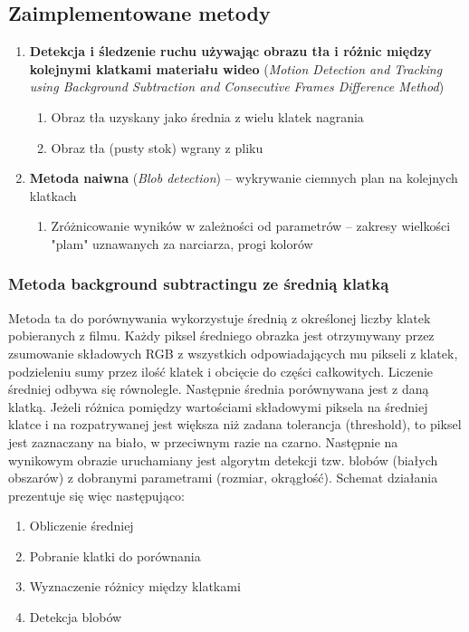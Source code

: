 \documentclass[a4paper]{article}
\begin{document}
\subsection{Zaimplementowane metody}
\label{sec:Methods}
\begin{enumerate}
\item \textbf{Detekcja i śledzenie ruchu używając obrazu tła i różnic między kolejnymi klatkami materiału wideo} (\textit{Motion Detection and Tracking using Background Subtraction and Consecutive Frames Difference Method})
	\begin{enumerate}
	\item Obraz tła uzyskany jako średnia z wielu klatek nagrania
	\item Obraz tła (pusty stok) wgrany z pliku
	\end{enumerate}
\item \textbf{Metoda naiwna} (\textit{Blob detection}) – wykrywanie ciemnych plan na kolejnych klatkach
	\begin{enumerate}
	\item Zróżnicowanie wyników w zależności od parametrów – zakresy wielkości "plam" uznawanych za narciarza, progi kolorów
	\end{enumerate}
\end{enumerate}	

\subsubsection{Metoda background subtractingu ze średnią klatką}
Metoda ta do porównywania wykorzystuje średnią z określonej liczby klatek pobieranych z filmu. Każdy piksel średniego obrazka jest otrzymywany przez zsumowanie składowych RGB z wszystkich odpowiadających mu pikseli z klatek, podzieleniu sumy przez ilość klatek i obcięcie do części całkowitych. Liczenie średniej odbywa się równolegle. Następnie średnia porównywana jest z daną klatką. Jeżeli różnica pomiędzy wartościami składowymi piksela na średniej klatce i na rozpatrywanej jest większa niż zadana tolerancja (threshold), to piksel jest zaznaczany na biało, w przeciwnym razie na czarno. Następnie na wynikowym obrazie uruchamiany jest algorytm detekcji tzw. blobów (białych obszarów) z dobranymi parametrami (rozmiar, okrągłość).
Schemat działania prezentuje się więc następująco:
\begin{enumerate}
\item Obliczenie średniej
\item Pobranie klatki do porównania
\item Wyznaczenie różnicy między klatkami
\item Detekcja blobów
\end{enumerate}
\end{document}
